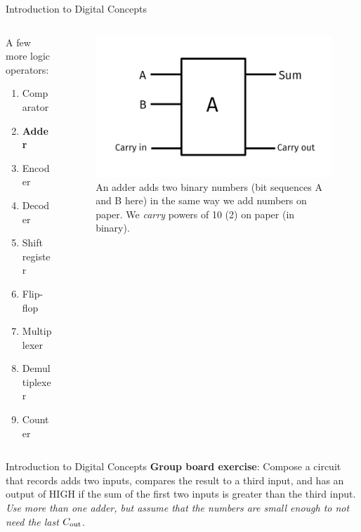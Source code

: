 \documentclass{beamer}
\begin{document}
\begin{frame}{Introduction to Digital Concepts}
\begin{columns}[T]
\begin{column}{0.5\textwidth}
A few more logic operators:
\begin{enumerate}
\item Comparator
\item \textbf{\alert{Adder}}
\item Encoder
\item Decoder
\item Shift register
\item Flip-flop
\item Multiplexer
\item Demultiplexer
\item Counter
\end{enumerate}
\end{column}
\begin{column}{0.5\textwidth}
\begin{figure}
\centering
\includegraphics[width=\textwidth]{figures/Adder.pdf}
\caption{\label{fig:adder} An adder adds two binary numbers (bit sequences A and B here) in the same way we add numbers on paper.  We \textit{carry} powers of 10 (2) on paper (in binary).}
\end{figure}
\end{column}
\end{columns}
\end{frame}

\begin{frame}{Introduction to Digital Concepts}
\textbf{Group board exercise}:
Compose a circuit that records adds two inputs, compares the result to a third input, and has an output of HIGH if the sum of the first two inputs is greater than the third input.  \textit{Use more than one adder, but assume that the numbers are small enough to not need the last $C_{\rm out}$}.
\end{frame}
\end{document}
